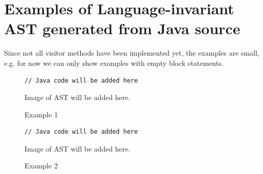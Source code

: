 \documentclass[a4paper]{article}
\begin{document}
\section{Examples of Language-invariant AST generated from Java source}
\label{sec:examples}

Since not all visitor methods have been implemented yet, the examples are small, e.g. for now we can only show examples with empty block statements.

\begin{figure}[h!]
\begin{lstlisting}
// Java code will be added here
\end{lstlisting}
Image of AST will be added here.
\caption{Example 1}
\label{fig:ast1}
\end{figure}

\begin{figure}[h!]
\begin{lstlisting}
// Java code will be added here
\end{lstlisting}
Image of AST will be added here.
\caption{Example 2}
\label{fig:ast2}
\end{figure}
\end{document}
